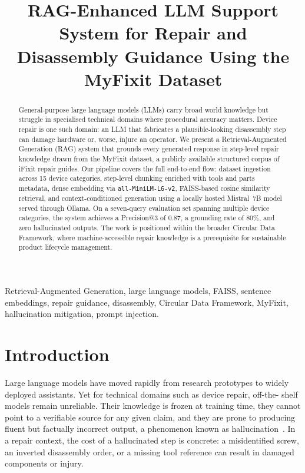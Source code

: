 \documentclass[journal,onecolumn]{IEEEtran}
\title{RAG-Enhanced LLM Support System for Repair and \\ Disassembly Guidance Using the MyFixit Dataset}
\author{
    \IEEEauthorblockN{Asim}
    \IEEEauthorblockA{
        \textit{M.Sc.\ Machine Learning and Data Analytics}\\
        \textit{Hochschule Aalen}\\
        Aalen, Germany\\
    }
    \and
    \IEEEauthorblockN{Prof.\ Oday Al-Hyali (Supervisor)}
    \IEEEauthorblockA{
        \textit{Human in Command Research Project}\\
        \textit{Hochschule Aalen}\\
        Aalen, Germany
    }
}
\begin{document}
\maketitle

\begin{abstract}
General-purpose large language models (LLMs) carry broad world knowledge but
struggle in specialised technical domains where procedural accuracy matters.
Device repair is one such domain: an LLM that fabricates a plausible-looking
disassembly step can damage hardware or, worse, injure an operator. We present
a Retrieval-Augmented Generation (RAG) system that grounds every generated
response in step-level repair knowledge drawn from the MyFixit dataset, a
publicly available structured corpus of iFixit repair guides. Our pipeline
covers the full end-to-end flow: dataset ingestion across 15 device categories,
step-level chunking enriched with tools and parts metadata, dense embedding via
\texttt{all-MiniLM-L6-v2}, FAISS-based cosine similarity retrieval, and
context-conditioned generation using a locally hosted Mistral~7B model served
through Ollama. On a seven-query evaluation set spanning multiple device
categories, the system achieves a Precision@3 of 0.87, a grounding rate of
80\%, and zero hallucinated outputs. The work is positioned within the broader
Circular Data Framework, where machine-accessible repair knowledge is a
prerequisite for sustainable product lifecycle management.
\end{abstract}

\begin{IEEEkeywords}
Retrieval-Augmented Generation, large language models, FAISS, sentence
embeddings, repair guidance, disassembly, Circular Data Framework, MyFixit,
hallucination mitigation, prompt injection.
\end{IEEEkeywords}

\section{Introduction}

Large language models have moved rapidly from research prototypes to widely
deployed assistants. Yet for technical domains such as device repair, off-the-
shelf models remain unreliable. Their knowledge is frozen at training time,
they cannot point to a verifiable source for any given claim, and they are
prone to producing fluent but factually incorrect output, a phenomenon known as
hallucination~\cite{ji2023hallucination}. In a repair context, the cost of a
hallucinated step is concrete: a misidentified screw, an inverted disassembly
order, or a missing tool reference can result in damaged components or injury.
\end{document}
